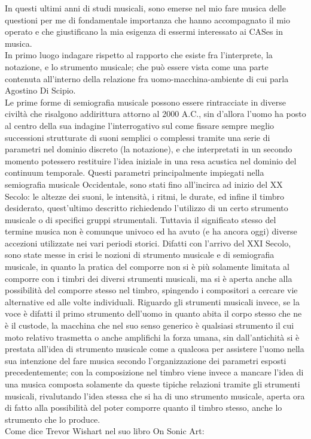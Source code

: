 In questi ultimi anni di studi musicali, sono emerse nel mio fare musica 
delle questioni per me di fondamentale importanza che hanno accompagnato il mio operato
e che giustificano la mia esigenza di essermi interessato ai CASes in musica. \\
In primo luogo indagare rispetto al rapporto che esiste fra l'interprete, la notazione, e lo strumento musicale;
che può essere vista come una parte contenuta all'interno della relazione fra uomo-macchina-ambiente di cui parla
Agostino Di Scipio. \\
Le prime forme di semiografia musicale possono essere rintracciate in diverse civiltà 
che risalgono addirittura attorno al 2000 A.C.,
sin d'allora l'uomo ha posto al centro della sua indagine l'interrogativo sul come fissare sempre meglio 
successioni strutturate di suoni semplici o complessi tramite una serie di parametri nel dominio discreto (la notazione), 
e che interpretati in un secondo momento potessero restituire l'idea iniziale in una resa 
acustica nel dominio del continuum temporale.
Questi parametri principalmente impiegati nella semiografia musicale Occidentale, 
sono stati fino all'incirca ad inizio del XX Secolo: 
le altezze dei suoni, le intensità, i ritmi, le durate, ed infine il timbro desiderato, 
quest'ultimo descritto richiedendo l'utilizzo di un certo strumento musicale o di specifici gruppi strumentali.
Tuttavia il significato stesso del termine musica non è comunque univoco ed ha avuto (e ha ancora oggi) 
diverse accezioni utilizzate nei vari periodi storici.
Difatti con l'arrivo del XXI Secolo, sono state messe in crisi le nozioni di strumento musicale e di semiografia musicale, 
in quanto la pratica del comporre non si è più solamente limitata al comporre 
con i timbri dei diversi strumenti musicali, ma si è aperta anche alla possibilità del comporre stesso nel timbro, 
spingendo i compositori a cercare vie alternative ed alle volte individuali.
Riguardo gli strumenti musicali invece, se la voce è difatti il primo strumento dell'uomo in quanto 
abita il corpo stesso che ne è il custode, la macchina che nel suo senso generico è qualsiasi strumento 
il cui moto relativo trasmetta o anche amplifichi la forza umana, 
sin dall'antichità si è prestata all'idea di strumento musicale come a qualcosa per assistere l'uomo nella 
sua intenzione del fare musica secondo l'organizzazione dei parametri esposti precedentemente; 
con la composizione nel timbro viene invece a mancare l'idea 
di una musica composta solamente da queste tipiche relazioni tramite gli strumenti musicali, 
rivalutando l'idea stessa che si ha di uno strumento musicale, aperta ora di fatto alla possibilità 
del poter comporre quanto il timbro stesso, anche lo strumento che lo produce. \\
Come dice Trevor Wishart nel suo libro On Sonic Art:

